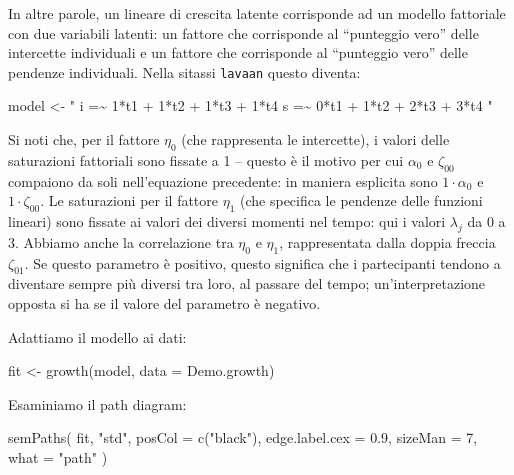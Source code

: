 \documentclass[
  11pt,
]{krantz}
\makeatletter
\newenvironment{Shaded}{\begin{snugshade}}{\end{snugshade}}
\newcommand{\AttributeTok}[1]{\textcolor[rgb]{0.61,0.61,0.61}{#1}}
\newcommand{\DecValTok}[1]{\textcolor[rgb]{0.06,0.06,0.06}{#1}}
\newcommand{\FloatTok}[1]{\textcolor[rgb]{0.06,0.06,0.06}{#1}}
\newcommand{\FunctionTok}[1]{\textcolor[rgb]{0,0,0}{#1}}
\newcommand{\NormalTok}[1]{#1}
\newcommand{\OtherTok}[1]{\textcolor[rgb]{0.37,0.37,0.37}{#1}}
\newcommand{\StringTok}[1]{\textcolor[rgb]{0.5,0.5,0.5}{#1}}
\newenvironment{kframe}{%
\medskip{}
\setlength{\fboxsep}{.8em}
 \def\at@end@of@kframe{}%
 \ifinner\ifhmode%
  \def\at@end@of@kframe{\end{minipage}}%
  \begin{minipage}{\columnwidth}%
 \fi\fi%
 \def\FrameCommand##1{\hskip\@totalleftmargin \hskip-\fboxsep
 \colorbox{shadecolor}{##1}\hskip-\fboxsep
     \hskip-\linewidth \hskip-\@totalleftmargin \hskip\columnwidth}%
 \MakeFramed {\advance\hsize-\width
   \@totalleftmargin\z@ \linewidth\hsize
   \@setminipage}}%
 {\par\unskip\endMakeFramed%
 \at@end@of@kframe}
\renewenvironment{Shaded}{\begin{kframe}}{\end{kframe}}
\theoremstyle{definition}
\theoremstyle{definition}
\theoremstyle{definition}
\theoremstyle{definition}
\theoremstyle{remark}
\makeatother
\begin{document}
In altre parole, un lineare di crescita latente corrisponde ad un modello fattoriale con due variabili latenti: un fattore che corrisponde al ``punteggio vero'' delle intercette individuali e un fattore che corrisponde al ``punteggio vero'' delle pendenze individuali. Nella sitassi \texttt{lavaan} questo diventa:

\begin{Shaded}
\begin{Highlighting}[]
\NormalTok{model }\OtherTok{\textless{}{-}} \StringTok{"}
\StringTok{ i =\textasciitilde{} 1*t1 + 1*t2 + 1*t3 + 1*t4}
\StringTok{ s =\textasciitilde{} 0*t1 + 1*t2 + 2*t3 + 3*t4}
\StringTok{"}
\end{Highlighting}
\end{Shaded}

Si noti che, per il fattore \(\eta_0\) (che rappresenta le intercette), i valori delle saturazioni fattoriali sono fissate a 1 -- questo è il motivo per cui \(\alpha_0\) e \(\zeta_{00}\) compaiono da soli nell'equazione precedente: in maniera esplicita sono \(1 \cdot \alpha_0\) e \(1 \cdot \zeta_{00}\). Le saturazioni per il fattore \(\eta_1\) (che specifica le pendenze delle funzioni lineari) sono fissate ai valori dei diversi momenti nel tempo: qui i valori \(\lambda_j\) da 0 a 3. Abbiamo anche la correlazione tra \(\eta_0\) e \(\eta_1\), rappresentata dalla doppia freccia \(\zeta_{01}\). Se questo parametro è positivo, questo significa che i partecipanti tendono a diventare sempre più diversi tra loro, al passare del tempo; un'interpretazione opposta si ha se il valore del parametro è negativo.

Adattiamo il modello ai dati:

\begin{Shaded}
\begin{Highlighting}[]
\NormalTok{fit }\OtherTok{\textless{}{-}} \FunctionTok{growth}\NormalTok{(model, }\AttributeTok{data =}\NormalTok{ Demo.growth)}
\end{Highlighting}
\end{Shaded}

Esaminiamo il path diagram:

\begin{Shaded}
\begin{Highlighting}[]
\FunctionTok{semPaths}\NormalTok{(}
\NormalTok{  fit, }\StringTok{"std"}\NormalTok{,}
  \AttributeTok{posCol =} \FunctionTok{c}\NormalTok{(}\StringTok{"black"}\NormalTok{),}
  \AttributeTok{edge.label.cex =} \FloatTok{0.9}\NormalTok{,}
  \AttributeTok{sizeMan =} \DecValTok{7}\NormalTok{,}
  \AttributeTok{what =} \StringTok{"path"}
\NormalTok{)}
\end{Highlighting}
\end{Shaded}
\end{document}

